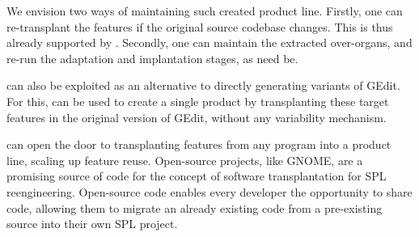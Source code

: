 We envision two ways of maintaining such created product line. 
Firstly, one can re-transplant the features if the original source codebase changes. This is thus already supported by \autoscalpel.
Secondly, one can maintain the extracted over-organs, and re-run the adaptation and implantation stages, as need be. 

\FOUNDRY can also be exploited as an alternative to directly generating variants of GEdit. For this, \autoscalpel can be used to create a single product by transplanting these target features in the original version of GEdit, without any variability mechanism.

\FOUNDRY can open the door to transplanting features from any program  into a product line, scaling up feature reuse. 
Open-source projects, like GNOME, are a promising source of code for the concept of software transplantation for SPL reengineering. Open-source code enables every developer the opportunity to share code, allowing them to migrate an already existing code from a pre-existing source into their own SPL project.

